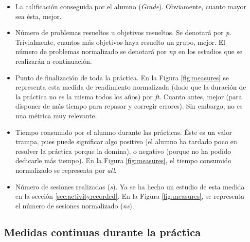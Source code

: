 \begin{itemize}
\item La calificación conseguida por el alumno (\emph{Grade}). Obviamente, cuanto mayor sea ésta, mejor.
\item Número de problemas resueltos u objetivos resueltos. Se denotará por \emph{p}. Trivialmente, cuantos más objetivos haya resuelto un grupo, mejor. El número de problemas normalizado se denotará por \emph{np} en los estudios que se realizarán a continuación.
\item Punto de finalización de toda la práctica. En la Figura \ref{fig:measures}  se representa esta medida de rendimiento normalizada (dado que la duración de la práctica no es la misma todos los años) por \emph{ft}. Cuanto antes, mejor (para disponer de más tiempo para repasar y corregir errores). Sin embargo, no es una métrica muy relevante.
\item Tiempo consumido por el alumno durante las prácticas. Éste es un valor trampa, pues puede significar algo positivo (el alumno ha tardado poco en resolver la práctica porque la domina), o negativo (porque no ha podido dedicarle más tiempo). En la Figura \ref{fig:measures}, el tiempo consumido normalizado se representa por \emph{all}.
\item Número de sesiones realizadas (\emph{s}). Ya se ha hecho un estudio de esta medida en la sección \ref{sec:activityrecorded}. En la Figura \ref{fig:measures}, se representa el número de sesiones normalizado (\emph{ns}).
\end{itemize}

\subsection{Medidas continuas durante la práctica}

